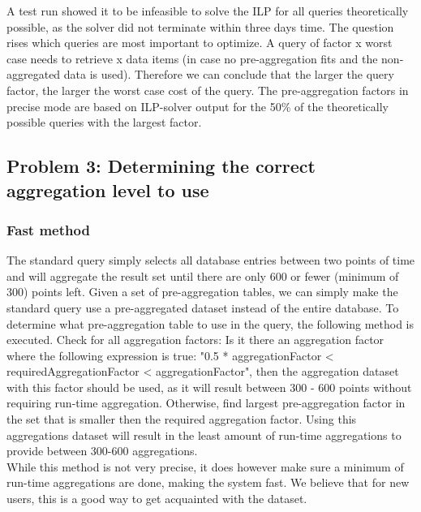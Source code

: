 A test run showed it to be infeasible to solve the ILP for all queries theoretically possible, as the solver did not terminate within three days time. The question rises which queries are most important to optimize. A query of factor x worst case needs to retrieve x data items (in case no pre-aggregation fits and the non-aggregated data is used). Therefore we can conclude that the larger the query factor, the larger the worst case cost of the query. The pre-aggregation factors in precise mode are based on ILP-solver output for the 50\% of the theoretically possible queries with the largest factor. 

\subsection{Problem 3: Determining the correct aggregation level to use}
\subsubsection{Fast method}
The standard query simply selects all database entries between two points of time and will aggregate the result set until there are only 600 or fewer (minimum of 300) points left. Given a set of pre-aggregation tables, we can simply make the standard query use a pre-aggregated dataset instead of the entire database. To determine what pre-aggregation table to use in the query, the following method is executed. Check for all aggregation factors: Is it there an aggregation factor where the following expression is true: "0.5 * aggregationFactor < requiredAggregationFactor < aggregationFactor", then the aggregation dataset with this factor should be used, as it will result between 300 - 600 points without requiring run-time aggregation. Otherwise, find largest pre-aggregation factor in the set that is smaller then the required aggregation factor. Using this aggregations dataset will result in the least amount of run-time aggregations to provide between 300-600 aggregations.\\

While this method is not very precise, it does however make sure a minimum of run-time aggregations are done, making the system fast. We believe that for new users, this is a good way to get acquainted with the dataset.

